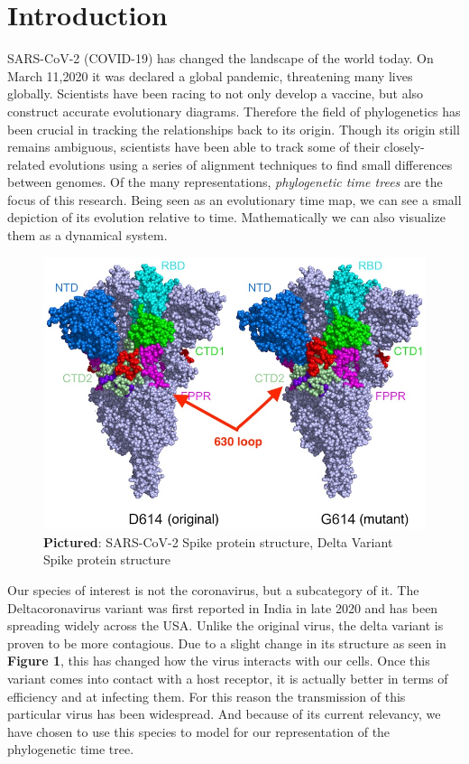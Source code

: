 \section{Introduction}
\label{sec:introduction}

SARS-CoV-2 (COVID-19) has changed the landscape of the world today. 
On March 11,2020 it was declared a global pandemic, threatening many lives globally. Scientists have been racing to not only develop a vaccine, but also construct accurate evolutionary diagrams. 
Therefore the field of phylogenetics has been crucial in tracking the relationships back to its origin. 
Though its origin still remains ambiguous, scientists have been able to track some of their closely-related evolutions using a series of alignment techniques to find small differences between genomes. 
Of the many representations, \emph{phylogenetic time trees} are the focus of this research. 
Being seen as an evolutionary time map, we can see a small depiction of its evolution relative to time. 
Mathematically we can also visualize them as a dynamical system. 

\begin{figure}[h]
\centering
\includegraphics[width=.5\textwidth]{figures/Cov2.jpg}
\caption{\textbf{Pictured}: SARS-CoV-2 Spike protein structure, Delta Variant Spike protein structure \cite{Fliesler}}
\end{figure}

Our species of interest is not the coronavirus, but a subcategory of it. 
The Deltacoronavirus variant was first reported in India in late 2020 and has been spreading widely across the USA. 
Unlike the original virus, the delta variant is proven to be more contagious. 
Due to a slight change in its structure as seen in \textbf{Figure 1}, this has changed how the virus interacts with our cells. 
Once this variant comes into contact with a host receptor, it is actually better in terms of efficiency and at infecting them. 
For this reason the transmission of this particular virus has been widespread. 
And because of its current relevancy, we have chosen to use this species to model for our representation of the phylogenetic time tree.        

